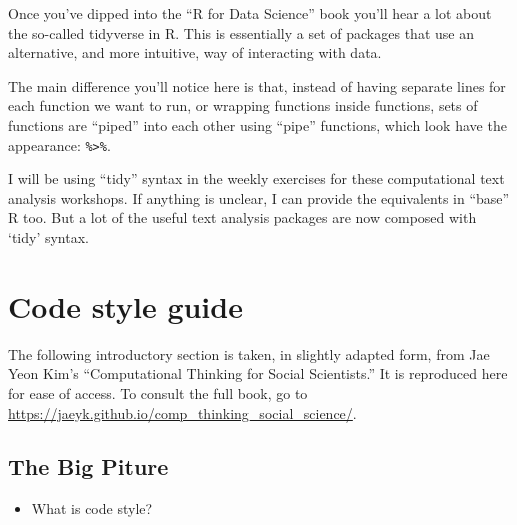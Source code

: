 \documentclass[
  letterpaper,
  DIV=11,
  numbers=noendperiod]{scrreprt}
\providecommand{\tightlist}{%
  \setlength{\itemsep}{0pt}\setlength{\parskip}{0pt}}\usepackage{longtable,booktabs,array}
\begin{document}
Once you've dipped into the ``R for Data Science'' book you'll hear a
lot about the so-called tidyverse in R. This is essentially a set of
packages that use an alternative, and more intuitive, way of interacting
with data.

The main difference you'll notice here is that, instead of having
separate lines for each function we want to run, or wrapping functions
inside functions, sets of functions are ``piped'' into each other using
``pipe'' functions, which look have the appearance:
\texttt{\%\textgreater{}\%}.

I will be using ``tidy'' syntax in the weekly exercises for these
computational text analysis workshops. If anything is unclear, I can
provide the equivalents in ``base'' R too. But a lot of the useful text
analysis packages are now composed with `tidy' syntax.


\hypertarget{code-style-guide}{%
\chapter*{Code style guide}\label{code-style-guide}}

\begin{tcolorbox}[enhanced jigsaw, colframe=quarto-callout-note-color-frame, breakable, bottomrule=.15mm, left=2mm, colback=white, leftrule=.75mm, arc=.35mm, rightrule=.15mm, opacityback=0, toprule=.15mm]
\begin{minipage}[t]{5.5mm}
\textcolor{quarto-callout-note-color}{\faInfo}
\end{minipage}%
\begin{minipage}[t]{\textwidth - 5.5mm}
The following introductory section is taken, in slightly adapted form,
from Jae Yeon Kim's ``Computational Thinking for Social Scientists.'' It
is reproduced here for ease of access. To consult the full book, go to
\url{https://jaeyk.github.io/comp_thinking_social_science/}.\end{minipage}%
\end{tcolorbox}

\hypertarget{the-big-piture}{%
\section*{The Big Piture}\label{the-big-piture}}

\begin{itemize}
\tightlist
\item
  What is code style?
\end{itemize}
\end{document}

